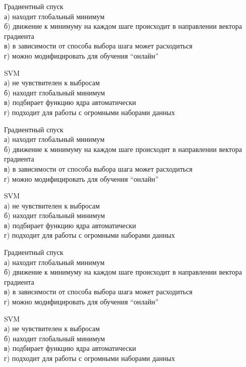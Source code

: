 \documentclass[10pt,a4paper]{article}
\author{Nikolay Anokhin}
\begin{document}
\thispagestyle{empty}

\noindent Градиентный спуск \\
а) находит глобальный минимум \\
б) движение к минимуму на каждом шаге происходит в направлении вектора градиента \\
в) в зависимости от способа выбора шага может расходиться \\
г) можно модифицировать для обучения ``онлайн''

\vspace{1em}
\noindent SVM \\
а) не чувствителен к выбросам \\
б) находит глобальный минимум \\
в) подбирает функцию ядра автоматически \\
г) подходит для работы с огромными наборами данных

\vspace{2em}
\noindent Градиентный спуск \\
а) находит глобальный минимум \\
б) движение к минимуму на каждом шаге происходит в направлении вектора градиента \\
в) в зависимости от способа выбора шага может расходиться \\
г) можно модифицировать для обучения ``онлайн''

\vspace{1em}
\noindent SVM \\
а) не чувствителен к выбросам \\
б) находит глобальный минимум \\
в) подбирает функцию ядра автоматически \\
г) подходит для работы с огромными наборами данных

\vspace{2em}
\noindent Градиентный спуск \\
а) находит глобальный минимум \\
б) движение к минимуму на каждом шаге происходит в направлении вектора градиента \\
в) в зависимости от способа выбора шага может расходиться \\
г) можно модифицировать для обучения ``онлайн''

\vspace{1em}
\noindent SVM \\
а) не чувствителен к выбросам \\
б) находит глобальный минимум \\
в) подбирает функцию ядра автоматически \\
г) подходит для работы с огромными наборами данных
\end{document}
